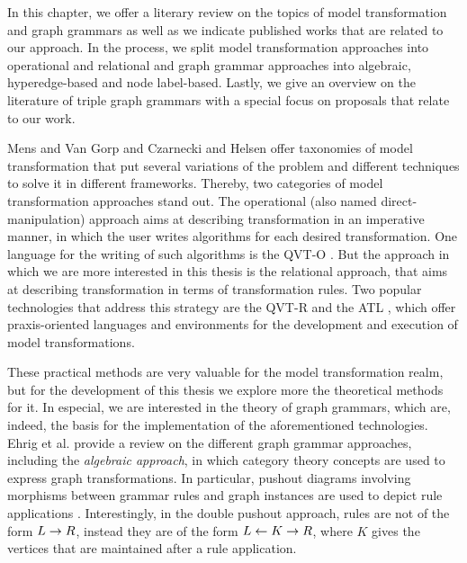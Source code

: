 In this chapter, we offer a literary review on the topics of model transformation and graph grammars as well as we indicate published works that are related to our approach. In the process, we split model transformation approaches into operational and relational and graph grammar approaches into algebraic, hyperedge-based and node label-based. Lastly, we give an overview on the literature of triple graph grammars with a special focus on proposals that relate to our work.

Mens and Van Gorp \cite{mens2006taxonomy} and Czarnecki and Helsen \cite{czarnecki2003classification} offer taxonomies of model transformation that put several variations of the problem and different techniques to solve it in different frameworks. Thereby, two categories of model transformation approaches stand out. The operational (also named direct-manipulation) approach aims at describing transformation in an imperative manner, in which the user writes algorithms for each desired transformation. One language for the writing of such algorithms is the QVT-O \cite{omg2008meta}. But the approach in which we are more interested in this thesis is the relational approach, that aims at describing transformation in terms of transformation rules. Two popular technologies that address this strategy are the QVT-R \cite{omg2008meta} and the ATL \cite{jouault2006atl}, which offer praxis-oriented languages and environments for the development and execution of model transformations.

These practical methods are very valuable for the model transformation realm, but for the development of this thesis we explore more the theoretical methods for it. In especial, we are interested in the theory of graph grammars, which are, indeed, the basis for the implementation of the aforementioned technologies. Ehrig et al. \cite{ehrig1999handbook} provide a review on the different graph grammar approaches, including the \emph{algebraic approach}, in which category theory concepts are used to express graph transformations. In particular, pushout diagrams involving morphisms between grammar rules and graph instances are used to depict rule applications \cite{corradini1997algebraic}. Interestingly, in the double pushout approach, rules are not of the form $L \to R$, instead they are of the form $L \leftarrow K \to R$, where $K$ gives the vertices that are maintained after a rule application.

